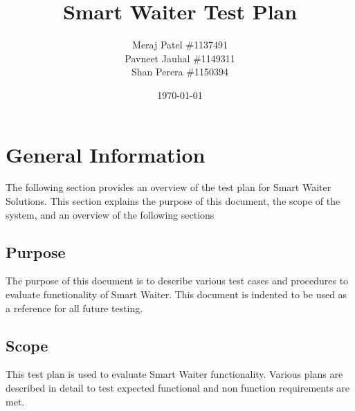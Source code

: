 \documentclass[12pt]{article}
\begin{document}
\title{Smart Waiter Test Plan} 
\author{Meraj Patel \#1137491 \\ Pavneet Jauhal \#1149311\\ Shan Perera \#1150394}
\date{\today}
\maketitle
\pagebreak

\tableofcontents

\listoftables


\pagebreak
%
%

\section{General Information}
The following section provides an overview of the test plan 
for Smart Waiter Solutions.
 This section explains the purpose of this document, the scope of the system, and an overview of the following sections

\subsection{Purpose}
The purpose of this document is to describe  various test cases and procedures to evaluate functionality of Smart Waiter.
This document is indented to be used as a reference for all future testing. 

\subsection{Scope}
This test plan is used to evaluate Smart Waiter functionality. Various plans are described in detail to test expected functional and non function requirements are met.  
\end{document}
